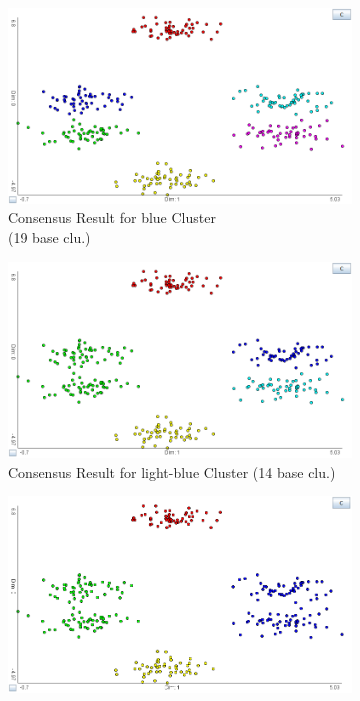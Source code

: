 \documentclass[
	a4paper,
	english,
	twoside,
	openright,               
	11pt                            
	]{report}
\begin{document}
\begin{figure}[h]
\centering
\begin{subfigure}[t]{.49\textwidth}
  \centering
  \includegraphics[width=.95\linewidth]{multi_c6}
  \caption{Consensus Result for blue Cluster\\(19 base clu.)}
  \label{fig:multi_c6}
\end{subfigure}
\hfill
\begin{subfigure}[t]{.49\textwidth}
  \centering
  \includegraphics[width=.95\linewidth]{multi_c5_2}
  \caption{Consensus Result for light-blue Cluster (14 base clu.)}
  \label{fig:multi_c5_2}
\end{subfigure}
\medskip
\begin{subfigure}[t]{.49\textwidth}
  \centering
  \includegraphics[width=.95\linewidth]{multi_c4}

\end{subfigure}
\end{figure}
\end{document}
